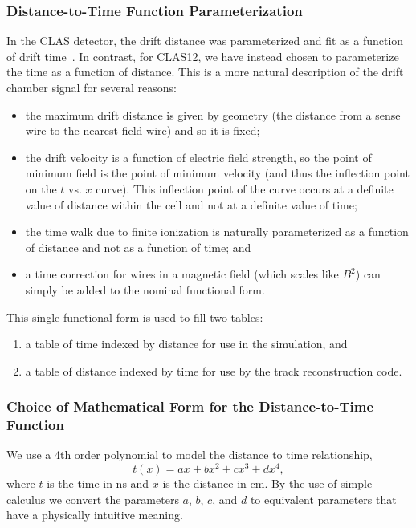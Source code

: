 \subsubsection{Distance-to-Time Function Parameterization}
\label{funcpar} 

In the CLAS detector, the drift distance was parameterized and fit as a function
of drift time~\cite{mdm95}.
In contrast, for CLAS12, we have instead chosen to parameterize the time as a function of
distance.  This is a more natural description of the drift chamber signal
for several reasons:
\begin{itemize}
\item the maximum drift distance is given by geometry (the distance from
a sense wire to the nearest field wire) and so it is fixed;
\item the drift velocity is a function of electric field strength, so the point of minimum field is the point of
minimum velocity (and thus the inflection point on the $t$ vs. $x$ curve). 
This inflection point of the curve occurs at a
definite value of distance within the cell and not at a definite value of time;
\item the time walk due to finite ionization is
naturally parameterized as a function of distance and not as a function of time; and
\item  a time correction for wires in a magnetic field (which
scales like $B^2$) can simply be added to the nominal functional form.
\end{itemize}

This single functional form is used to fill two tables: 
\begin{enumerate}
\item a table of time indexed by distance for use in the simulation, and 
\item a table of distance indexed by time for use by the track reconstruction code.
\end{enumerate}

\subsubsection{Choice of Mathematical Form for the Distance-to-Time Function}

We use a 4th order polynomial to model the distance to time relationship,
\begin{equation}
t(x) =  a x + b x^2 + c x^3 + d x^4,
\end{equation}
where $t$ is the time in ns and $x$ is the distance in cm.
By the use of simple calculus we convert the parameters $a$, $b$, $c$, and $d$ to equivalent 
parameters that have a physically intuitive meaning.

